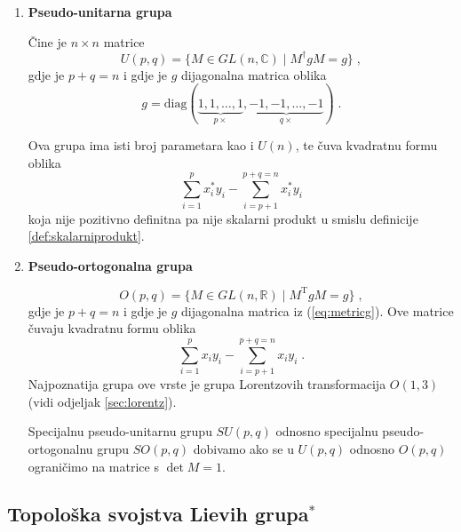 \begin{enumerate}
\item \textbf{Pseudo-unitarna grupa}

Čine je $n\times n$ matrice
\begin{equation}
U(p, q) = \{ M\in GL(n,\mathbb{C}) \; | \; M^{\dagger} g M = g\} \;,
\end{equation}
gdje je $p+q=n$ i gdje je $g$ dijagonalna matrica oblika
\begin{equation}
  g = \mathrm{diag}(\underbrace{1, 1, \dots, 1}_{p \times},
\underbrace{-1, -1, \dots, -1}_{q \times}) \;.
\label{eq:metricg}
\end{equation}

Ova grupa ima isti broj parametara kao i $U(n)$, te
čuva kvadratnu formu oblika
\begin{equation}
 \sum_{i=1}^{p} x_{i}^* y_{i} - \sum_{i=p+1}^{p+q=n} x_{i}^* y_i 
\end{equation}
koja nije pozitivno definitna pa nije skalarni produkt u smislu
definicije \ref{def:skalarniprodukt}.


\item \textbf{Pseudo-ortogonalna grupa}

\begin{equation}
O(p, q) = \{ M\in GL(n,\mathbb{R}) \; | \; M^{\mathrm{T}} g M = g \} \;,
\end{equation}
gdje je $p+q=n$ i gdje je $g$ dijagonalna matrica iz (\ref{eq:metricg}).
Ove matrice čuvaju kvadratnu formu oblika
\begin{equation}
 \sum_{i=1}^{p} x_{i} y_{i} - \sum_{i=p+1}^{p+q=n} x_{i} y_i  \;.
\end{equation}
Najpoznatija grupa ove vrste je grupa Lorentzovih transformacija  $O(1,3)$
(vidi odjeljak \ref{sec:lorentz}).

Specijalnu pseudo-unitarnu grupu $SU(p,q)$ odnosno specijalnu pseudo-ortogonalnu
grupu $SO(p,q)$ dobivamo ako se u $U(p,q)$ odnosno $O(p, q)$
ograničimo na matrice s $\det M = 1$.

\end{enumerate}

\subsection{Topološka svojstva Lievih grupa$^*$}

